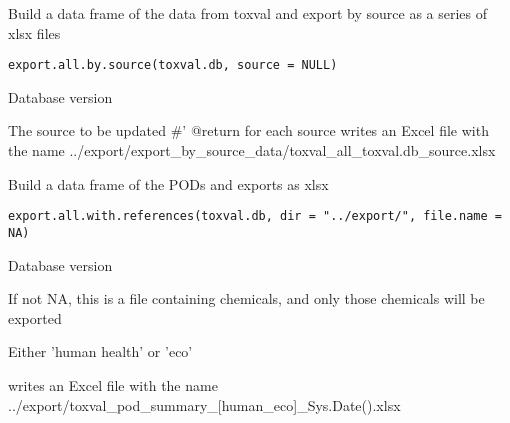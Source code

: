 \documentclass[letterpaper]{book}
\begin{document}
%
\begin{Description}\relax
Build a data frame of the data from toxval and export by source as a
series of xlsx files
\end{Description}
%
\begin{Usage}
\begin{verbatim}
export.all.by.source(toxval.db, source = NULL)
\end{verbatim}
\end{Usage}
%
\begin{Arguments}
\begin{ldescription}
\item[\code{toxval.db}] Database version

\item[\code{source}] The source to be updated
\#' @return for each source writes an Excel file with the name
../export/export\_by\_source\_data/toxval\_all\_toxval.db\_source.xlsx
\end{ldescription}
\end{Arguments}
%
\begin{Description}\relax
Build a data frame of the PODs and exports as xlsx
\end{Description}
%
\begin{Usage}
\begin{verbatim}
export.all.with.references(toxval.db, dir = "../export/", file.name = NA)
\end{verbatim}
\end{Usage}
%
\begin{Arguments}
\begin{ldescription}
\item[\code{toxval.db}] Database version

\item[\code{file.name}] If not NA, this is a file containing chemicals, and only those chemicals will be exported

\item[\code{human\_eco}] Either 'human health' or 'eco'
\end{ldescription}
\end{Arguments}
%
\begin{Value}
writes an Excel file with the name
../export/toxval\_pod\_summary\_[human\_eco]\_Sys.Date().xlsx
\end{Value}
\end{document}
